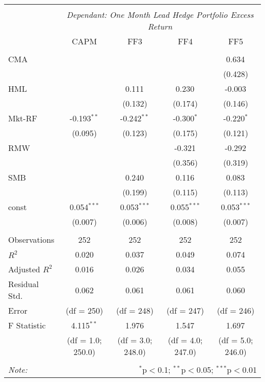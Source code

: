 \begin{table}[H] \centering
\begin{tabular}{@{\extracolsep{5pt}}lcccc}
\\[-1.8ex]\hline
\hline \\[-1.8ex]
& \multicolumn{4}{c}{\textit{Dependant: One Month Lead Hedge Portfolio Excess Return}} \
\cr \cline{2-5}
\\[-1.8ex] & CAPM & FF3 & FF4 & FF5 \\
\hline \\[-1.8ex]
 CMA & & & & 0.634$^{}$ \\
  & & & & (0.428) \\
 HML & & 0.111$^{}$ & 0.230$^{}$ & -0.003$^{}$ \\
  & & (0.132) & (0.174) & (0.146) \\
 Mkt-RF & -0.193$^{**}$ & -0.242$^{**}$ & -0.300$^{*}$ & -0.220$^{*}$ \\
  & (0.095) & (0.123) & (0.175) & (0.121) \\
 RMW & & & -0.321$^{}$ & -0.292$^{}$ \\
  & & & (0.356) & (0.319) \\
 SMB & & 0.240$^{}$ & 0.116$^{}$ & 0.083$^{}$ \\
  & & (0.199) & (0.115) & (0.113) \\
 const & 0.054$^{***}$ & 0.053$^{***}$ & 0.055$^{***}$ & 0.053$^{***}$ \\
  & (0.007) & (0.006) & (0.008) & (0.007) \\
\hline \\[-1.8ex]
 Observations & 252 & 252 & 252 & 252 \\
 $R^2$ & 0.020 & 0.037 & 0.049 & 0.074 \\
 Adjusted $R^2$ & 0.016 & 0.026 & 0.034 & 0.055 \\
 Residual Std. & 0.062 & 0.061 & 0.061 & 0.060  \\
 Error  & (df = 250) & (df = 248) & (df = 247) & (df = 246)  \\
 F Statistic & 4.115$^{**}$  & 1.976$^{}$  & 1.547$^{}$  & 1.697$^{}$  \\
&  (df = 1.0; 250.0) &  (df = 3.0; 248.0) &  (df = 4.0; 247.0) & (df = 5.0; 246.0) \\
\hline
\hline \\[-1.8ex]
\textit{Note:} & \multicolumn{4}{r}{$^{*}$p$<$0.1; $^{**}$p$<$0.05; $^{***}$p$<$0.01} \\
\end{tabular}
\end{table}
